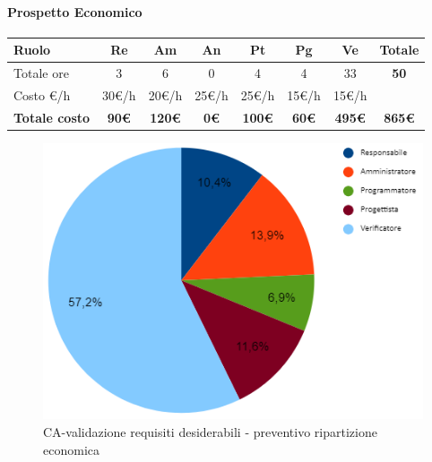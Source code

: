 \paragraph{Prospetto Economico}
\begin{center}
	\renewcommand{\arraystretch}{1.8} %
	\begin{tabular}{ |m{10em}|c|c|c|c|c|c|c| }
	\hline
	\textbf{Ruolo} & \textbf{Re} & \textbf{Am} &  \textbf{An} &  \textbf{Pt} &  \textbf{Pg} &  \textbf{Ve} &  \textbf{Totale}\\
    \hline
    Totale ore & 3 & 6 & 0 & 4 & 4 & 33 & \textbf{50}\\
    \hline
    Costo \euro/h & 30\euro/h & 20\euro/h & 25\euro/h & 25\euro/h & 15\euro/h & 15\euro/h & \\
    \hline
    \textbf{Totale costo} & \textbf{90\euro} & \textbf{120\euro} &  \textbf{0\euro} &  \textbf{100\euro} &  \textbf{60\euro} &  \textbf{495\euro} &  \textbf{865\euro}\\
    \hline
	\end{tabular}

\begin{figure}[H]
    \centering\includegraphics[scale=0.9]{images/preventivo/CA-desiderabili-costo.png}
    \caption{CA-validazione requisiti desiderabili - preventivo ripartizione economica}
\end{figure}
\end{center}


\newpage